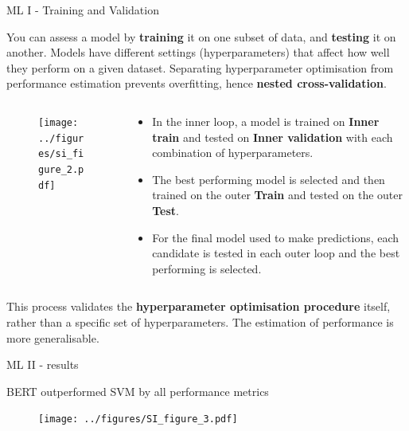 \documentclass[9pt]{beamer}
\begin{document}
\begin{frame}{ML I - Training and Validation}

\small

You can assess a model by \textbf{training} it on one subset of data, and \textbf{testing} it on another. Models have different settings (hyperparameters) that affect how well they perform on a given dataset. Separating hyperparameter optimisation from performance estimation prevents overfitting, hence \textbf{nested cross-validation}.
		
\begin{columns}
	\begin{column}{0.618\linewidth}
	\begin{figure}
		\texttt{[image: ../figures/si\_figure\_2.pdf]}
	\end{figure}
	\end{column}

	\begin{column}{0.382\linewidth}
		\begin{itemize}
			\item In the inner loop, a model is trained on \textbf{Inner train} and tested on \textbf{Inner validation} with each combination of hyperparameters. 
			\item The best performing model is selected and then trained on the outer \textbf{Train} and tested on the outer \textbf{Test}. 
			\item For the final model used to make predictions, each candidate is tested in each outer loop and the best performing is selected.
		\end{itemize}

	\end{column}
\end{columns}

\medskip

This process validates the \textbf{hyperparameter optimisation procedure} itself, rather than a specific set of hyperparameters. The estimation of performance is more generalisable.

\end{frame}

\begin{frame}{ML II - results}

BERT outperformed SVM by all performance metrics

\begin{figure}
	\texttt{[image: ../figures/SI\_figure\_3.pdf]}
\end{figure}

\end{frame}
\end{document}
